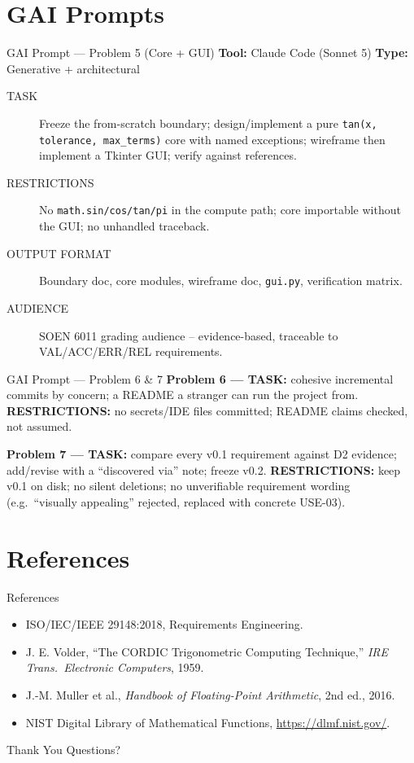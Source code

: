 \documentclass[10pt]{beamer}
\begin{document}
\section{GAI Prompts}
\begin{frame}{GAI Prompt --- Problem 5 (Core + GUI)}
  \footnotesize
  \textbf{Tool:} Claude Code (Sonnet 5) \quad \textbf{Type:} Generative + architectural
  \begin{description}
    \item[TASK] Freeze the from-scratch boundary; design/implement a pure \texttt{tan(x, tolerance, max\_terms)} core with named exceptions; wireframe then implement a Tkinter GUI; verify against references.
    \item[RESTRICTIONS] No \texttt{math.sin/cos/tan/pi} in the compute path; core importable without the GUI; no unhandled traceback.
    \item[OUTPUT FORMAT] Boundary doc, core modules, wireframe doc, \texttt{gui.py}, verification matrix.
    \item[AUDIENCE] SOEN 6011 grading audience -- evidence-based, traceable to VAL/ACC/ERR/REL requirements.
  \end{description}
\end{frame}

\begin{frame}{GAI Prompt --- Problem 6 \& 7}
  \footnotesize
  \textbf{Problem 6 --- TASK:} cohesive incremental commits by concern; a README a stranger can run the project from. \textbf{RESTRICTIONS:} no secrets/IDE files committed; README claims checked, not assumed.

  \vspace{0.3cm}
  \textbf{Problem 7 --- TASK:} compare every v0.1 requirement against D2 evidence; add/revise with a ``discovered via'' note; freeze v0.2. \textbf{RESTRICTIONS:} keep v0.1 on disk; no silent deletions; no unverifiable requirement wording (e.g.\ ``visually appealing'' rejected, replaced with concrete USE-03).
\end{frame}

\section{References}
\begin{frame}{References}
  \small
  \begin{itemize}
    \item ISO/IEC/IEEE 29148:2018, Requirements Engineering.
    \item J. E. Volder, ``The CORDIC Trigonometric Computing Technique,'' \emph{IRE Trans.\ Electronic Computers}, 1959.
    \item J.-M. Muller et al., \emph{Handbook of Floating-Point Arithmetic}, 2nd ed., 2016.
    \item NIST Digital Library of Mathematical Functions, \url{https://dlmf.nist.gov/}.
  \end{itemize}
\end{frame}

\begin{frame}{Thank You}
  \centering
  \Large Questions?
\end{frame}
\end{document}
